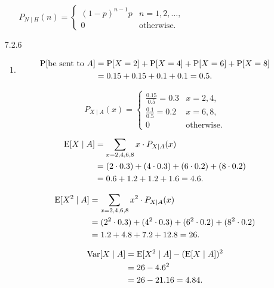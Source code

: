 \documentclass{article}
\begin{document}
\begin{enumerate}
\begin{enumerate}[label=(\alph*)]
        $P_{N \mid H}(n) = \begin{cases}
            (1 - p)^{n - 1}p & n = 1, 2, \dots, \\
            0 & \text{otherwise}.
        \end{cases}
        $
    \end{enumerate}

    \item [7.2.6]

    \begin{enumerate}[label=(\alph*)]
        \item 
        \begin{align*}
        \text P[\text{be sent to } A] 
        & = \text P[X = 2] + \text P[X = 4] + \text P[X = 6] + \text P[X = 8] \\
        & = 0.15 + 0.15 + 0.1 + 0.1 = 0.5.
        \end{align*}

        $$P_{X \mid A}(x) =
        \begin{cases}
            \frac{0.15}{0.5} = 0.3 & x = 2, 4, \\
            \frac{0.1}{0.5} = 0.2 & x = 6, 8, \\
            0 & \text{otherwise}.
        \end{cases}
        $$

        \begin{align*}
            \text E[X \mid A]
            & = \sum_{x = 2, 4, 6, 8} x \cdot P_{X \mid A}(x) \\
            & = (2 \cdot 0.3) + (4 \cdot 0.3) + (6 \cdot 0.2) + (8 \cdot 0.2) \\
            & = 0.6 + 1.2 + 1.2 + 1.6 = 4.6.
        \end{align*}

        \begin{align*}
            \text E[X^2 \mid A]
            & = \sum_{x = 2, 4, 6, 8} x^2 \cdot P_{X \mid A}(x) \\
            & = (2^2 \cdot 0.3) + (4^2 \cdot 0.3) + (6^2 \cdot 0.2) + (8^2 \cdot 0.2) \\
            & = 1.2 + 4.8 + 7.2 + 12.8 = 26.
        \end{align*}

        \begin{align*}
            \text{Var}[X \mid A]
            & = \text E[X^2 \mid A] - (\text E[X \mid A])^2 \\
            & = 26 - 4.6^2 \\
            & = 26 - 21.16 = 4.84.
        \end{align*}


\end{enumerate}
\end{enumerate}
\end{document}
